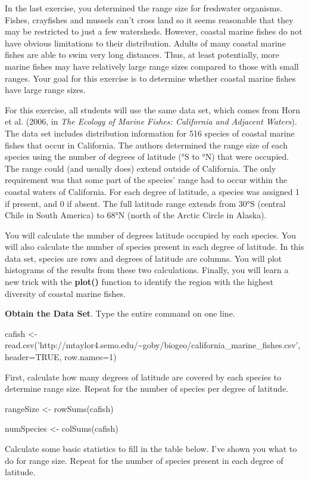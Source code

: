 In the last exercise, you determined the range size for freshwater
organisms. Fishes, crayfishes and mussels can't cross land so it seems
reasonable that they may be restricted to just a few watersheds.
However, coastal marine fishes do not have obvious limitations to their
distribution. Adults of many coastal marine fishes are able to swim very
long distances. Thus, at least potentially, more marine fishes may have
relatively large range sizes compared to those with small ranges. Your
goal for this exercise is to determine whether coastal marine fishes
have large range sizes.

For this exercise, all students will use the same data set, which comes
from Horn et al. (2006, in \emph{The Ecology of Marine Fishes:
California and Adjacent Waters}). The data set includes distribution
information for 516 species of coastal marine fishes that occur in
California. The authors determined the range size of each species using
the number of degrees of latitude (°S to °N) that were occupied. The
range could (and usually does) extend outside of California. The only
requirement was that some part of the species' range had to occur within
the coastal waters of California. For each degree of latitude, a species
was assigned 1 if present, and 0 if absent. The full latitude range
extends from 30°S (central Chile in South America) to 68°N (north of the
Arctic Circle in Alaska).

You will calculate the number of degrees latitude occupied by each
species. You will also calculate the number of species present in each
degree of latitude. In this data set, species are rows and degrees of
latitude are columns. You will plot histograms of the results from these
two calculations. Finally, you will learn a new trick with the
\textbf{plot()} function to identify the region with the highest
diversity of coastal marine fishes.

\textbf{Obtain the Data Set}. Type the entire command on one line.

cafish \textless{}-
read.csv('http://mtaylor4.semo.edu/\textasciitilde{}goby/biogeo/california\_marine\_fishes.csv',
header=TRUE, row.names=1)

First, calculate how many degrees of latitude are covered by each
species to determine range size. Repeat for the number of species per
degree of latitude.

rangeSize \textless{}- rowSums(cafish)

numSpecies \textless{}- colSums(cafish)

Calculate some basic statistics to fill in the table below. I've shown
you what to do for range size. Repeat for the number of species present
in each degree of latitude.

